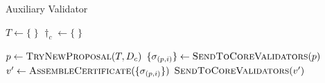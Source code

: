 \begin{algorithm}[t]
    \caption{Auxiliary Validator}
    \label{alg:auxiliary-validator}
    \algfontsize

    \begin{algorithmic}[1]
        \State $T \gets \{ \; \}$ 
        \State $\dag_c \gets \{ \; \}$ 

        \Statex
        \State $p \gets \Call{TryNewProposal}{T, \dag_c}$
         \Return \EndIf
        \State $\{ \sigma_{(p,i)} \} \gets \Call{SendToCoreValidators}{p}$
        \State $v' \gets \Call{AssembleCertificate}{\{ \sigma_{(p,i)} \}}$
        \State $\Call{SendToCoreValidators}{v'}$
        \EndProcedure
    \end{algorithmic}
\end{algorithm}